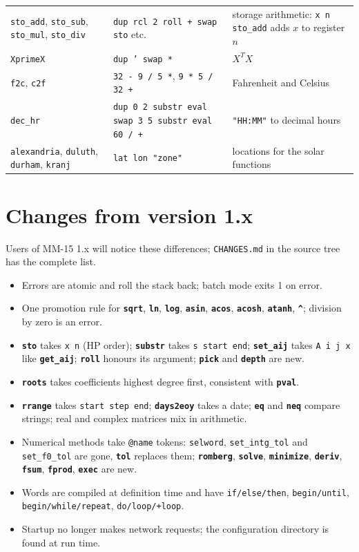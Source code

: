 \documentclass[11pt,letterpaper]{article}
\newcommand{\code}[1]{\texttt{#1}}
\newcommand{\cmd}[1]{\texttt{\textbf{#1}}}
\newcommand{\stk}[1]{\texttt{#1}}
\begin{document}
\begin{longtable}{@{}>{\raggedright\arraybackslash}p{}>{\raggedright\arraybackslash}p{}>{\raggedright\arraybackslash}p{}@{}}
\code{sto\_add}, \code{sto\_sub}, \code{sto\_mul}, \code{sto\_div} & \code{dup rcl 2 roll + swap sto} etc. & storage arithmetic: \code{x n sto\_add} adds $x$ to register $n$ \\
\code{XprimeX} & \code{dup ' swap *}     & $X^T X$ \\
\code{f2c}, \code{c2f} & \code{32 - 9 / 5 *}, \code{9 * 5 / 32 +} & Fahrenheit and Celsius \\
\code{dec\_hr} & \code{dup 0 2 substr eval swap 3 5 substr eval 60 / +} & \code{"HH:MM"} to decimal hours \\
\code{alexandria}, \code{duluth}, \code{durham}, \code{kranj} & \code{lat lon "zone"} & locations for the solar functions \\
\end{longtable}

\clearpage
\section{Changes from version 1.x}
\label{app:changes}

Users of MM-15 1.x will notice these differences; \code{CHANGES.md} in the source tree has the complete list.
\begin{itemize}
  \item Errors are atomic and roll the stack back; batch mode exits 1 on error.
  \item One promotion rule for \cmd{sqrt}, \cmd{ln}, \cmd{log}, \cmd{asin}, \cmd{acos}, \cmd{acosh}, \cmd{atanh}, \cmd{\textasciicircum}; division by zero is an error.
  \item \cmd{sto} takes \stk{x n} (HP order); \cmd{substr} takes \stk{s start end}; \cmd{set\_aij} takes \stk{A i j x} like \cmd{get\_aij}; \cmd{roll} honours its argument; \cmd{pick} and \cmd{depth} are new.
  \item \cmd{roots} takes coefficients highest degree first, consistent with \cmd{pval}.
  \item \cmd{rrange} takes \stk{start step end}; \cmd{days2eoy} takes a date; \cmd{eq} and \cmd{neq} compare strings; real and complex matrices mix in arithmetic.
  \item Numerical methods take \code{@name} tokens: \code{selword}, \code{set\_intg\_tol} and \code{set\_f0\_tol} are gone, \cmd{tol} replaces them; \cmd{romberg}, \cmd{solve}, \cmd{minimize}, \cmd{deriv}, \cmd{fsum}, \cmd{fprod}, \cmd{exec} are new.
  \item Words are compiled at definition time and have \code{if/else/then}, \code{begin/until}, \code{begin/while/repeat}, \code{do/loop/+loop}.
  \item Startup no longer makes network requests; the configuration directory is found at run time.
\end{itemize}
\end{document}
